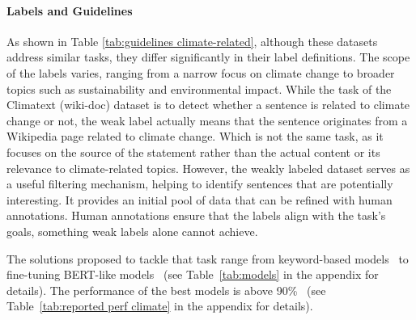 \paragraph{Labels and Guidelines} As shown in Table \ref{tab:guidelines climate-related}, although these datasets address similar tasks, they differ significantly in their label definitions. The scope of the labels varies, ranging from a narrow focus on climate change to broader topics such as sustainability and environmental impact. 
While the task of the Climatext (wiki-doc) dataset is to detect whether a sentence is related to climate change or not, the weak label actually means that the sentence originates from a Wikipedia page related to climate change. Which is not the same task, as it focuses on the source of the statement rather than the actual content or its relevance to climate-related topics. However, the weakly labeled dataset serves as a useful filtering mechanism, helping to identify sentences that are potentially interesting. It provides an initial pool of data that can be refined with human annotations. Human annotations ensure that the labels align with the task’s goals, something weak labels alone cannot achieve. 

\solutions The solutions proposed to tackle that task range from keyword-based models~\cite{varini_climatext_2020, bingler2023cheaptalkspecificitysentiment} to fine-tuning BERT-like models~\cite{varini_climatext_2020, nicolas_webersinke_climatebert_2021, garridomerchán2023finetuning, bingler2023cheaptalkspecificitysentiment, yu_climatebug_2024} (see Table~\ref{tab:models} in the appendix for details). The performance of the best models is above 90\%~\cite{garridomerchán2023finetuning, bingler2023cheaptalkspecificitysentiment, yu_climatebug_2024} (see Table~\ref{tab:reported perf climate} in the appendix for details). 

